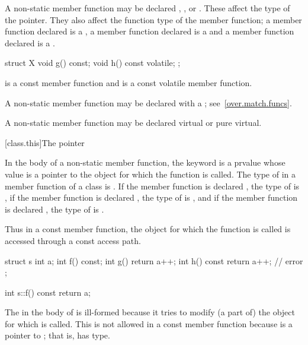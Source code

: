 \pnum
{}%
%
%
A non-static member function may be declared ,
, or  . These
 affect the type of the 
pointer. They also affect the function
type of the member function; a member function declared
 is a , a member function
declared  is a  and a
member function declared   is a
.
\begin{example}
\begin{codeblock}
struct X {
  void g() const;
  void h() const volatile;
};
\end{codeblock}

 is a const member function and  is a
const volatile member function.
\end{example}

\pnum
A non-static member function may be declared with a ; see~\ref{over.match.funcs}.

\pnum
A non-static member function may be declared
virtual or pure virtual.

[class.this]{The  pointer}%

\pnum
{}%
In the body of a non-static member function, the
keyword  is a prvalue whose value is
a pointer to the object for which the function is called.
%
The type of  in a member function of a class  is
.
If the member function is declared , the type of
 is  ,
if the member function is declared , the type of
 is  , and if the member function
is declared  , the type of  is
  .
\begin{note}
Thus in a const member function, the object for which the function is
called is accessed through a const access path.
\end{note}
\begin{example}
\begin{codeblock}
struct s {
  int a;
  int f() const;
  int g() { return a++; }
  int h() const { return a++; } // error
};

int s::f() const { return a; }
\end{codeblock}

The  in the body of  is ill-formed because it
tries to modify (a part of) the object for which  is
called. This is not allowed in a const member function because
 is a pointer to ; that is,  has
 type.
\end{example}

